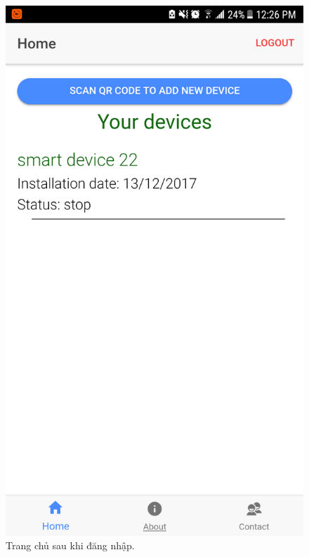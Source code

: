 \documentclass[a4paper,12pt,oneside]{article}
\begin{document}
\begin{figure}[H]
\centering
\includegraphics[scale=.25]{hinh/mobile_home.png}
\caption{Trang chủ sau khi đăng nhập.}
\end{figure}
\end{document}
